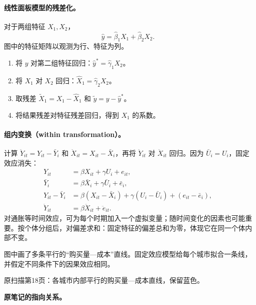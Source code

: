 {\paragraph{线性面板模型的残差化。}
对于两组特征 $X_1,X_2$，
\[\hat y=\hat\beta_1X_1+\hat\beta_2X_2.\]
图中的特征矩阵以观测为行、特征为列。
\begin{enumerate}
\item 将 $y$ 对第二组特征回归：$\hat y^*=\hat\gamma_1X_2$。
\item 将 $X_1$ 对 $X_2$ 回归：$\hat X_1=\hat\gamma_2X_2$。
\item 取残差 $\widetilde X_1=X_1-\hat X_1$ 和 $\widetilde y=y-\hat y^*$。
\item 将结果残差对特征残差回归，得到 $X_1$ 的系数。
\end{enumerate}

\paragraph{组内变换（within transformation）。}
计算 $\ddot Y_{it}=Y_{it}-\bar Y_i$ 和 $\ddot X_{it}=X_{it}-\bar X_i$，再将 $\ddot Y_{it}$ 对 $\ddot X_{it}$ 回归。因为 $\bar U_i=U_i$，固定效应消失：
\begin{align*}
Y_{it}&=\beta X_{it}+\gamma U_i+e_{it},\\
\bar Y_i&=\beta\bar X_i+\gamma\bar U_i+\bar e_i,\\
Y_{it}-\bar Y_i&=\beta(X_{it}-\bar X_i)+\gamma(U_i-\bar U_i)+(e_{it}-\bar e_i),\\
\ddot Y_{it}&=\beta\ddot X_{it}+\ddot e_{it}.
\end{align*}
 对通胀等时间效应，可为每个时期加入一个虚拟变量；随时间变化的因素也可能重要。按个体分组后，对偏差求和：固定特征的偏差总和为零，体现它在同一个体内部不变。

图中画了多条平行的“购买量—成本”直线。固定效应模型给每个城市拟合一条线，并假定不同条件下的因果效应相同。

\begin{center}
\par{\small 原扫描第18页：各城市内部平行的购买量—成本直线，保留蓝色。}
\end{center}
\par{}\smallskip\textbf{原笔记的指向关系。}\par\smallskip
{}
}
